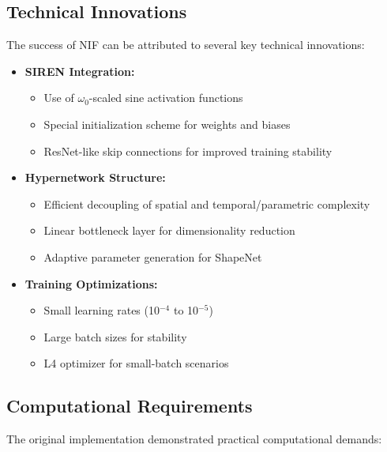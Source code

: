 \documentclass[10pt,journal,compsoc,onecolumn]{IEEEtran}
\begin{document}
\subsection{Technical Innovations}
The success of NIF can be attributed to several key technical innovations:

\begin{itemize}
    \item \textbf{SIREN Integration:}~\cite{siren2020}
    \begin{itemize}
        \item Use of $\omega_0$-scaled sine activation functions
        \item Special initialization scheme for weights and biases
        \item ResNet-like skip connections for improved training stability
    \end{itemize}
    
    \item \textbf{Hypernetwork Structure:}~\cite{hypernetworks2016}
    \begin{itemize}
        \item Efficient decoupling of spatial and temporal/parametric complexity
        \item Linear bottleneck layer for dimensionality reduction
        \item Adaptive parameter generation for ShapeNet
    \end{itemize}
    
    \item \textbf{Training Optimizations:}
    \begin{itemize}
        \item Small learning rates (10$^{-4}$ to 10$^{-5}$)
        \item Large batch sizes for stability
        \item L4 optimizer for small-batch scenarios
    \end{itemize}
\end{itemize}

\subsection{Computational Requirements}
The original implementation demonstrated practical computational demands:
\end{document}
